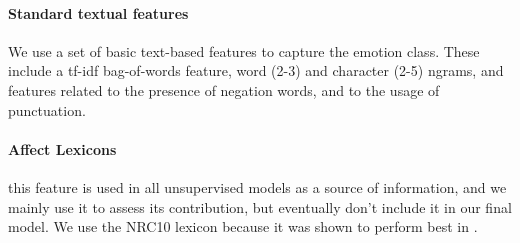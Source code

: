 \documentclass[11pt]{article}
\begin{document}
\paragraph{Standard textual features} We use a set of basic text-based features to capture the emotion class. These include a tf-idf bag-of-words feature, word (2-3) and character (2-5) ngrams, and features related to the presence of negation words, and to the usage of punctuation.


%

\paragraph{Affect Lexicons} this feature is used in all unsupervised models as a source of information, and we mainly use it to assess its contribution, but eventually don't include it in our final model. We use the NRC10 lexicon because it was shown to perform best in \cite{mohammad:2012:NAACL-HLT}.
\end{document}
